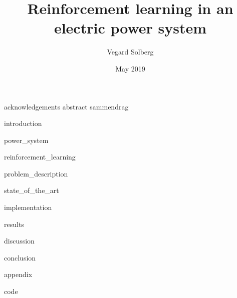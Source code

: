 \documentclass[11pt]{book}
\title{Reinforcement learning in an electric power system}
\author{Vegard Solberg}
\date{May 2019}
\begin{document}
    \frontmatter
    {acknowledgements}
    {abstract}
    {sammendrag}
    
    \tableofcontents
    \listoffigures
    \listoftables
    
    \mainmatter
    {introduction}
    
    {power_system}
 
    {reinforcement_learning}
    
    {problem_description}
    
    {state_of_the_art}
    
    {implementation}
    
    
    {results}
    
    {discussion}

    {conclusion}

    \printbibliography

    \appendix
    {appendix}
    
    {code}
    
\end{document}
